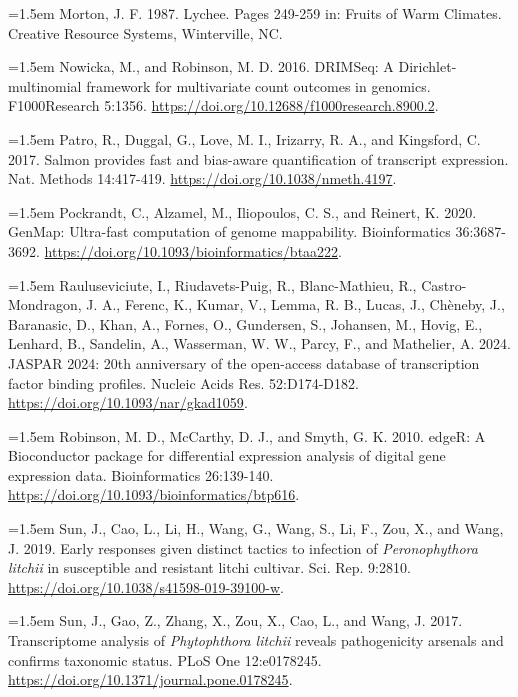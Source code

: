 \documentclass[12pt,letterpaper]{article}
\begin{document}
\noindent\hangindent=1.5em Morton, J. F. 1987. Lychee. Pages 249-259 in: Fruits of Warm Climates. Creative Resource Systems, Winterville, NC.\par

\noindent\hangindent=1.5em Nowicka, M., and Robinson, M. D. 2016. DRIMSeq: A Dirichlet-multinomial framework for multivariate count outcomes in genomics. F1000Research 5:1356. \url{https://doi.org/10.12688/f1000research.8900.2}.\par

\noindent\hangindent=1.5em Patro, R., Duggal, G., Love, M. I., Irizarry, R. A., and Kingsford, C. 2017. Salmon provides fast and bias-aware quantification of transcript expression. Nat. Methods 14:417-419. \url{https://doi.org/10.1038/nmeth.4197}.\par

\noindent\hangindent=1.5em Pockrandt, C., Alzamel, M., Iliopoulos, C. S., and Reinert, K. 2020. GenMap: Ultra-fast computation of genome mappability. Bioinformatics 36:3687-3692. \url{https://doi.org/10.1093/bioinformatics/btaa222}.\par

\noindent\hangindent=1.5em Rauluseviciute, I., Riudavets-Puig, R., Blanc-Mathieu, R., Castro-Mondragon, J. A., Ferenc, K., Kumar, V., Lemma, R. B., Lucas, J., Chèneby, J., Baranasic, D., Khan, A., Fornes, O., Gundersen, S., Johansen, M., Hovig, E., Lenhard, B., Sandelin, A., Wasserman, W. W., Parcy, F., and Mathelier, A. 2024. JASPAR 2024: 20th anniversary of the open-access database of transcription factor binding profiles. Nucleic Acids Res. 52:D174-D182. \url{https://doi.org/10.1093/nar/gkad1059}.\par

\noindent\hangindent=1.5em Robinson, M. D., McCarthy, D. J., and Smyth, G. K. 2010. edgeR: A Bioconductor package for differential expression analysis of digital gene expression data. Bioinformatics 26:139-140. \url{https://doi.org/10.1093/bioinformatics/btp616}.\par

\noindent\hangindent=1.5em Sun, J., Cao, L., Li, H., Wang, G., Wang, S., Li, F., Zou, X., and Wang, J. 2019. Early responses given distinct tactics to infection of \textit{Peronophythora litchii} in susceptible and resistant litchi cultivar. Sci. Rep. 9:2810. \url{https://doi.org/10.1038/s41598-019-39100-w}.\par

\noindent\hangindent=1.5em Sun, J., Gao, Z., Zhang, X., Zou, X., Cao, L., and Wang, J. 2017. Transcriptome analysis of \textit{Phytophthora litchii} reveals pathogenicity arsenals and confirms taxonomic status. PLoS One 12:e0178245. \url{https://doi.org/10.1371/journal.pone.0178245}.\par
\end{document}
